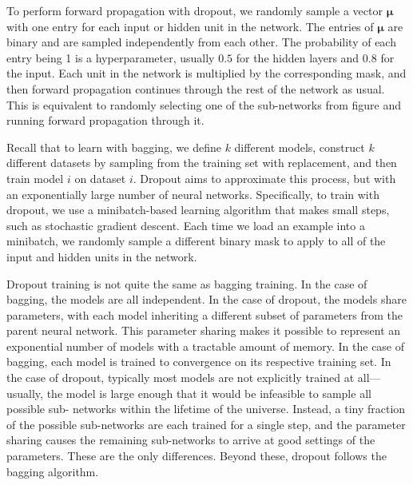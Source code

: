 \documentclass{article}
\begin{document}
		To perform forward propagation with dropout, we randomly sample a vector $\bm \mu$ with one entry for each input
		or hidden unit in the network. The entries of $\bm \mu$ are binary and are sampled independently from each other. The probability of each entry being 1 is a hyperparameter, usually $0.5$ for the hidden layers and $0.8$ for the input. Each unit in the network is multiplied by the corresponding mask, and then forward propagation continues through the rest of the	network as usual. This is equivalent to randomly selecting one of the sub-networks from figure and running forward propagation through it.
	
		 Recall that to learn with bagging, we define $k$ different models, construct $k$ different datasets by sampling from the training set with replacement, and then train model $i$ on dataset $i$. Dropout aims to approximate this process, but with an exponentially large number of neural networks. Specifically, to train with dropout, we use a minibatch-based learning algorithm that makes small steps, such as stochastic gradient descent. Each time we load an example into a minibatch, we randomly sample a different binary mask to apply to all of the input and hidden units in the network. 

		Dropout training is not quite the same as bagging training. In the case of
		bagging, the models are all independent. In the case of dropout, the models share
		parameters, with each model inheriting a different subset of parameters from the
		parent neural network. This parameter sharing makes it possible to represent an
		exponential number of models with a tractable amount of memory. In the case of
		bagging, each model is trained to convergence on its respective training set. In the
		case of dropout, typically most models are not explicitly trained at all—usually,
		the model is large enough that it would be infeasible to sample all possible sub-
		networks within the lifetime of the universe. Instead, a tiny fraction of the possible
		sub-networks are each trained for a single step, and the parameter sharing causes
		the remaining sub-networks to arrive at good settings of the parameters. These
		are the only differences. Beyond these, dropout follows the bagging algorithm.

	
\end{document}
